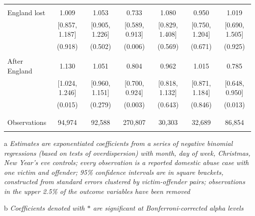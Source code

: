 \documentclass[12pt, a4paper]{article}
\begin{document}
\begin{table}
{\begin{threeparttable}
\begin{tabular}{@{\extracolsep{5pt}}lcccccc}
  & & & & & & \\ 
 England lost & 1.009 & 1.053 & 0.733 & 1.080 & 0.950 & 1.019 \\ 
  & [0.857, 1.187] & [0.905, 1.226] & [0.589, 0.913] & [0.829, 1.408] & [0.750, 1.204] & [0.690, 1.505] \\ 
  & (0.918) & (0.502) & (0.006) & (0.569) & (0.671) & (0.925) \\ 
  & & & & & & \\ 
 After England & 1.130 & 1.051 & 0.804 & 0.962 & 1.015 & 0.785 \\ 
  & [1.024, 1.246] & [0.960, 1.151] & [0.700, 0.924] & [0.818, 1.132] & [0.871, 1.184] & [0.648, 0.950] \\ 
  & (0.015) & (0.279) & (0.003) & (0.643) & (0.846) & (0.013) \\ 
  & & & & & & \\ 
\hline \\[-1.8ex] 
Observations & 94,974 & 92,588 & 270,807 & 30,303 & 32,689 & 86,854  \\ 
\hline \\[-1.8ex] 
\end{tabular} 
\begin{tablenotes}
      \item[a] \textit{Estimates are exponentiated coefficients from a series of negative binomial regressions (based on tests of overdispersion) with month, day of week, Christmas, New Year's eve controls; every observation is a reported domestic abuse case with one victim and offender; 95\% confidence intervals are in square brackets, constructed from standard errors clustered by victim-offender pairs; observations in the upper 2.5\% of the outcome variables have been removed}
          \item[b] \textit{Coefficients denoted with $*$ are significant at Bonferroni-corrected alpha levels}
    \end{tablenotes}
\end{threeparttable}   }
\end{table}
\end{document}
